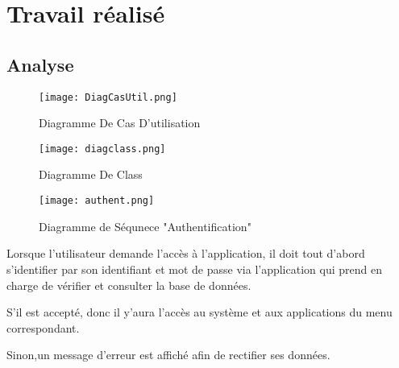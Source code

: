 \documentclass[../rapportdestage.tex]{subfiles}
\begin{document}
 
 

\section{Travail réalisé}
	
	\subsection{Analyse}
		
		
		
	\begin{figure}[bh]
\centering
\texttt{[image: DiagCasUtil.png]} 
 
\label{fig:DiagrameDeCasDutilisation}
\caption{Diagramme De Cas D'utilisation}

%
%	
%	
\texttt{[image: diagclass.png]} 
 
\label{fig:DiagrameDeClass}
\caption{Diagramme De Class }
\end{figure}

	\newpage
		
	
	
	
	
	\begin{figure}[bh]
\centering
\texttt{[image: authent.png]} 
 
\label{fig:Authentification }
\caption{Diagramme de Séqunece "Authentification" }
\end{figure}
Lorsque l’utilisateur demande l’accès à l’application, il doit tout d’abord s’identifier par son identifiant et mot de passe via l’application qui prend en charge de vérifier et consulter la base de données.

S’il est accepté, donc il y’aura l’accès au système et aux applications du menu correspondant.

Sinon,un message  d’erreur est affiché afin de rectifier ses données.


\newpage
\end{document}
